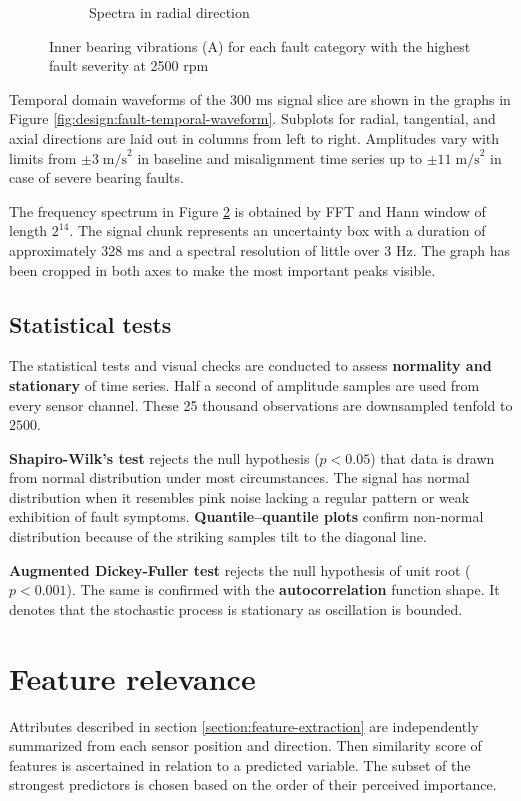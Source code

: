 \begin{figure}[ht]
\begin{subfigure}[b]{0.55\textwidth}
        \caption{Spectra in radial direction}
        \label{fig:design:fault-spectral-waveform}
    \end{subfigure} 
    \caption{Inner bearing vibrations (A) for each fault category with the highest fault severity at 2500 rpm}
\end{figure}

Temporal domain waveforms of the 300 ms signal slice are shown in the graphs in Figure \ref{fig:design:fault-temporal-waveform}. Subplots for radial, tangential, and axial directions are laid out in columns from left to right. Amplitudes vary with limits from $\pm 3\; \mathrm{m/s}^2$ in baseline and misalignment time series up to $\pm 11\;\mathrm{m/s}^2$ in case of severe bearing faults. 

The frequency spectrum in Figure \ref{fig:design:fault-spectral-waveform} is obtained by FFT and Hann window of length $2^{14}$. The signal chunk represents an uncertainty box with a duration of approximately 328 ms and a spectral resolution of little over 3 Hz. The graph has been cropped in both axes to make the most important peaks visible.


\subsection{Statistical tests}
The statistical tests and visual checks are conducted to assess \textbf{normality and stationary} of time series. Half a second of amplitude samples are used from every sensor channel. These 25 thousand observations are downsampled tenfold to $2500$. 

\textbf{Shapiro-Wilk's test} rejects the null hypothesis (${p < 0.05}$) that data is drawn from normal distribution under most circumstances. The signal has normal distribution when it resembles pink noise lacking a regular pattern or weak exhibition of fault symptoms. \textbf{Quantile–quantile plots} confirm non-normal distribution because of the striking samples tilt to the diagonal line.

\textbf{Augmented Dickey-Fuller test} rejects the null hypothesis of unit root 
(${p < 0.001}$). The same is confirmed with the \textbf{autocorrelation} function shape. It denotes that the stochastic process is stationary as oscillation is bounded.

\section{Feature relevance}
Attributes described in section \ref{section:feature-extraction} are independently summarized from each sensor position and direction. Then similarity score of features is ascertained in relation to a predicted variable. The subset of the strongest predictors is chosen based on the order of their perceived importance.

